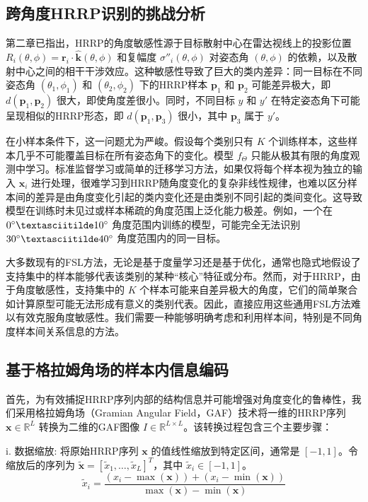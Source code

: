 \subsection{跨角度HRRP识别的挑战分析}
\label{subsec:angle_challenge_analysis}

第二章已指出，HRRP的角度敏感性源于目标散射中心在雷达视线上的投影位置 $R_i(\theta, \phi) = \mathbf{r}_i \cdot \hat{\mathbf{k}}(\theta, \phi)$ 和复幅度 $\sigma''_i(\theta, \phi)$ 对姿态角 $(\theta, \phi)$ 的依赖，以及散射中心之间的相干干涉效应。这种敏感性导致了巨大的类内差异：同一目标在不同姿态角 $(\theta_1, \phi_1)$ 和 $(\theta_2, \phi_2)$ 下的HRRP样本 $\mathbf{p}_1$ 和 $\mathbf{p}_2$ 可能差异极大，即 $d(\mathbf{p}_1, \mathbf{p}_2)$ 很大，即使角度差很小。同时，不同目标 $y$ 和 $y'$ 在特定姿态角下可能呈现相似的HRRP形态，即 $d(\mathbf{p}_1, \mathbf{p}_3)$ 很小，其中 $\mathbf{p}_3$ 属于 $y'$。

在小样本条件下，这一问题尤为严峻。假设每个类别只有 $K$ 个训练样本，这些样本几乎不可能覆盖目标在所有姿态角下的变化。模型 $f_\Theta$ 只能从极其有限的角度观测中学习。标准监督学习或简单的迁移学习方法，如果仅将每个样本视为独立的输入 $\mathbf{x}_i$ 进行处理，很难学习到HRRP随角度变化的复杂非线性规律，也难以区分样本间的差异是由角度变化引起的类内变化还是由类别不同引起的类间变化。这导致模型在训练时未见过或样本稀疏的角度范围上泛化能力极差。例如，一个在 $0^\circ \textasciitilde 10^\circ$ 角度范围内训练的模型，可能完全无法识别 $30^\circ \textasciitilde 40^\circ$ 角度范围内的同一目标。

大多数现有的FSL方法，无论是基于度量学习还是基于优化，通常也隐式地假设了支持集中的样本能够代表该类别的某种“核心”特征或分布。然而，对于HRRP，由于角度敏感性，支持集中的 $K$ 个样本可能来自差异极大的角度，它们的简单聚合如计算原型可能无法形成有意义的类别代表。因此，直接应用这些通用FSL方法难以有效克服角度敏感性。我们需要一种能够明确考虑和利用样本间，特别是不同角度样本间关系信息的方法。

\subsection{基于格拉姆角场的样本内信息编码}
\label{subsec:gaf}

首先，为有效捕捉HRRP序列内部的结构信息并可能增强对角度变化的鲁棒性，我们采用格拉姆角场（Gramian Angular Field，GAF）技术将一维的HRRP序列 $\mathbf{x} \in \mathbb{R}^L$ 转换为二维的GAF图像 $I \in \mathbb{R}^{L \times L}$。该转换过程包含三个主要步骤：

i.  数据缩放: 将原始HRRP序列 $\mathbf{x}$ 的值线性缩放到特定区间，通常是 $[-1, 1]$。令缩放后的序列为 $\tilde{\mathbf{x}} = [\tilde{x}_1, \dots, \tilde{x}_L]^T$，其中 $\tilde{x}_i \in [-1, 1]$。
    \begin{equation}
        \tilde{x}_i = \frac{(x_i - \max(\mathbf{x})) + (x_i - \min(\mathbf{x}))}{\max(\mathbf{x}) - \min(\mathbf{x})}
        \label{eq:gaf_scaling}
    \end{equation}
    
